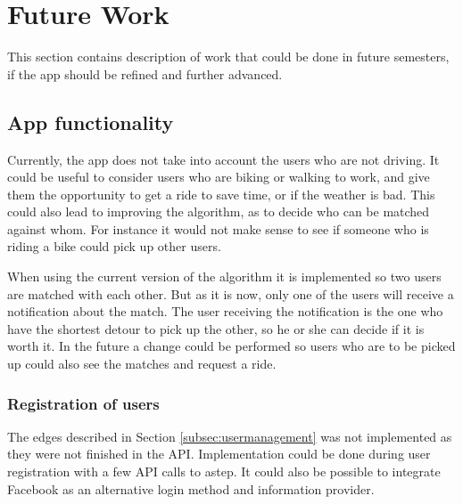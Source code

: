 \section{Future Work}\label{sec:future}
This section contains description of work that could be done in future semesters, if the app should be refined and further advanced.

\subsection{App functionality}
Currently, the app does not take into account the users who are not driving.
It could be useful to consider users who are biking or walking to work, and give them the opportunity to get a ride to save time, or if the weather is bad.
This could also lead to improving the algorithm, as to decide who can be matched against whom.
For instance it would not make sense to see if someone who is riding a bike could pick up other users.

When using the current version of the algorithm it is implemented so two users are matched with each other.
But as it is now, only one of the users will receive a notification about the match.
The user receiving the notification is the one who have the shortest detour to pick up the other, so he or she can decide if it is worth it. 
In the future a change could be performed so users who are to be picked up could also see the matches and request a ride. 


\subsubsection*{Registration of users}
The edges described in Section \ref{subsec:usermanagement} was not implemented as they were not finished in the API.
Implementation could be done during user registration with a few API calls to \gls{astep}.
It could also be possible to integrate Facebook as an alternative login method and information provider.

